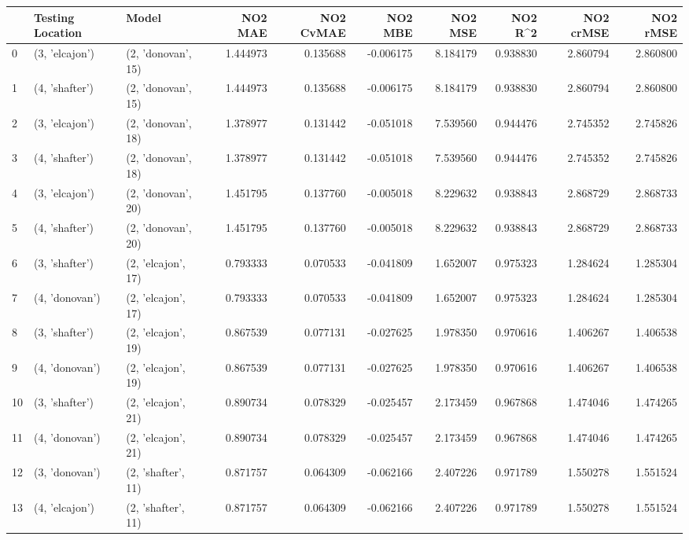 \begin{tabular}{lllrrrrrrr}
\toprule
{} & Testing Location &               Model &   NO2 MAE &  NO2 CvMAE &   NO2 MBE &    NO2 MSE &   NO2 R\textasciicircum2 &  NO2 crMSE &  NO2 rMSE \\
\midrule
0  &   (3, 'elcajon') &  (2, 'donovan', 15) &  1.444973 &   0.135688 & -0.006175 &   8.184179 &  0.938830 &   2.860794 &  2.860800 \\
1  &   (4, 'shafter') &  (2, 'donovan', 15) &  1.444973 &   0.135688 & -0.006175 &   8.184179 &  0.938830 &   2.860794 &  2.860800 \\
2  &   (3, 'elcajon') &  (2, 'donovan', 18) &  1.378977 &   0.131442 & -0.051018 &   7.539560 &  0.944476 &   2.745352 &  2.745826 \\
3  &   (4, 'shafter') &  (2, 'donovan', 18) &  1.378977 &   0.131442 & -0.051018 &   7.539560 &  0.944476 &   2.745352 &  2.745826 \\
4  &   (3, 'elcajon') &  (2, 'donovan', 20) &  1.451795 &   0.137760 & -0.005018 &   8.229632 &  0.938843 &   2.868729 &  2.868733 \\
5  &   (4, 'shafter') &  (2, 'donovan', 20) &  1.451795 &   0.137760 & -0.005018 &   8.229632 &  0.938843 &   2.868729 &  2.868733 \\
6  &   (3, 'shafter') &  (2, 'elcajon', 17) &  0.793333 &   0.070533 & -0.041809 &   1.652007 &  0.975323 &   1.284624 &  1.285304 \\
7  &   (4, 'donovan') &  (2, 'elcajon', 17) &  0.793333 &   0.070533 & -0.041809 &   1.652007 &  0.975323 &   1.284624 &  1.285304 \\
8  &   (3, 'shafter') &  (2, 'elcajon', 19) &  0.867539 &   0.077131 & -0.027625 &   1.978350 &  0.970616 &   1.406267 &  1.406538 \\
9  &   (4, 'donovan') &  (2, 'elcajon', 19) &  0.867539 &   0.077131 & -0.027625 &   1.978350 &  0.970616 &   1.406267 &  1.406538 \\
10 &   (3, 'shafter') &  (2, 'elcajon', 21) &  0.890734 &   0.078329 & -0.025457 &   2.173459 &  0.967868 &   1.474046 &  1.474265 \\
11 &   (4, 'donovan') &  (2, 'elcajon', 21) &  0.890734 &   0.078329 & -0.025457 &   2.173459 &  0.967868 &   1.474046 &  1.474265 \\
12 &   (3, 'donovan') &  (2, 'shafter', 11) &  0.871757 &   0.064309 & -0.062166 &   2.407226 &  0.971789 &   1.550278 &  1.551524 \\
13 &   (4, 'elcajon') &  (2, 'shafter', 11) &  0.871757 &   0.064309 & -0.062166 &   2.407226 &  0.971789 &   1.550278 &  1.551524 \\

\end{tabular}
